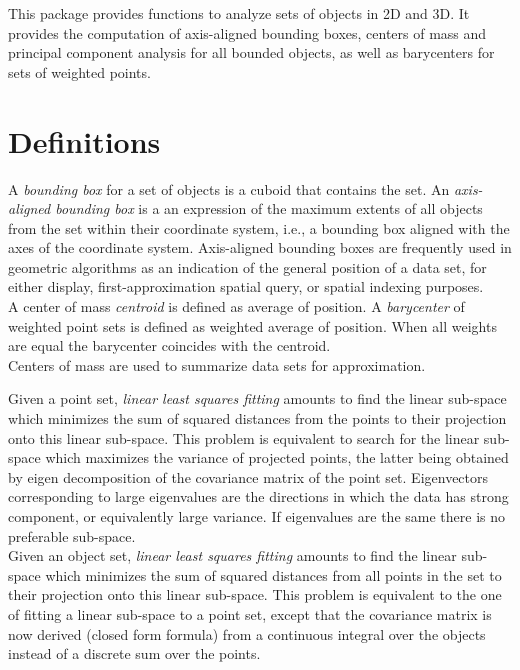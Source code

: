 This package provides functions to analyze sets of objects in 2D and 3D. It provides the computation of axis-aligned bounding boxes, centers of mass and principal component analysis for all bounded objects, as well as barycenters for sets of weighted points.\\


\section{Definitions}

A \emph{bounding box} for a set of objects is a cuboid that contains the set. An \emph{axis-aligned bounding box} is a an expression of the maximum extents of all objects from the set within their coordinate system, i.e., a bounding box aligned with the axes of the coordinate system. Axis-aligned bounding boxes are frequently used in geometric algorithms as an indication of the general position of a data set, for either display, first-approximation spatial query, or spatial indexing purposes. \\

A center of mass \emph{centroid} is defined as average of position. A \emph{barycenter} of weighted point sets is defined as weighted
average of position. When all weights are equal the barycenter coincides with the centroid.\\
Centers of mass are used to summarize data sets for approximation.


Given a point set, \emph{linear least squares fitting} amounts to find the linear sub-space which minimizes the sum of squared distances from the points to their projection onto this linear sub-space. This problem is equivalent to search for the linear sub-space which maximizes the variance of projected points, the latter being obtained by eigen decomposition of the covariance matrix of the point set. Eigenvectors corresponding to large eigenvalues are the
directions in which the data has strong component, or equivalently large variance. If eigenvalues are the same there is no preferable sub-space.\\

Given an object set, \emph{linear least squares fitting} amounts to find the linear sub-space which minimizes the sum of squared distances from all points in the set to their projection onto this linear sub-space. This problem is equivalent to the one of fitting a linear sub-space to a point set, except that the covariance matrix is now derived (closed form formula) from a continuous integral over the objects instead of a discrete sum over the points.


